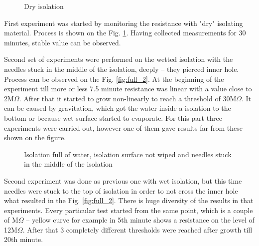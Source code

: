 \documentclass[a4paper, keeplastbox]{jacow}
\def\figurename{Fig.}
\begin{document}
\begin{figure}[H]
	\begin{center}
		\scalebox{.7}{}
	\end{center}
	\caption{Dry isolation}
	\label{fig:dry}
\end{figure}

First experiment was started by monitoring the resistance with "dry" isolating material. Process is shown on the \figurename{} \ref{fig:dry}. Having collected measurements for 30 minutes, stable value can be observed.

Second set of experiments were performed on the wetted isolation with the needles stuck in the middle of the isolation, deeply -- they pierced inner hole. Process can be observed on the \figurename{} \ref{fig:full_2}. At the beginning of the experiment till more or less \num{7.5} minute resistance was linear with a value close to 2M$\Omega$. After that it started to grow non-linearly to reach a threshold of 30M$\Omega$. It can be caused by gravitation, which got the water inside a isolation to the bottom or because wet surface started to evaporate. For this part three experiments were carried out, however one of them gave results far from these shown on the figure.

\begin{figure}[H]
	\begin{center}
	\end{center}
	\caption{Isolation full of water, isolation surface not wiped and needles stuck in the middle of the isolation}
	\label{fig:full_1}
\end{figure}

Second experiment was done as previous one with wet isolation, but this time needles were stuck to the top of isolation in order to not cross the inner hole what resulted in the \figurename{} \ref{fig:full_2}. There is huge diversity of the results in that experiments. Every particular test started from the same point, which is a couple of M$\Omega$ -- yellow curve for example in 5th minute shows a resistance on the level of 12M$\Omega$. After that 3 completely different thresholds were reached after growth till 20th minute. 
\end{document}
